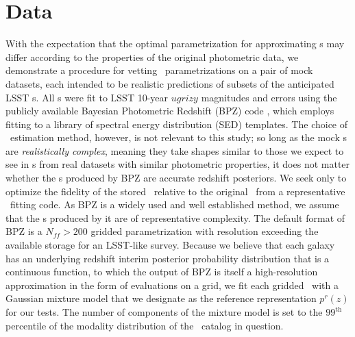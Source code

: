 \section{Data}

With the expectation that the optimal parametrization for approximating \pz s 
may differ according to the properties of the original photometric data, we 
demonstrate a procedure for vetting \pz\ parametrizations on a pair of mock 
datasets, each intended to be realistic predictions of subsets of the 
anticipated LSST \pz s.
All \pz s were fit to LSST 10-year $ugrizy$ magnitudes and errors 
\citep{ivezic_lsst:_2008} using the publicly available Bayesian Photometric 
Redshift (BPZ) code \citep{benitez_bayesian_2000}, which employs fitting to a 
library of spectral energy distribution (SED) templates.
The choice of \pz\ estimation method, however, is not relevant to this study; 
so long as the mock \pz s are \textit{realistically complex}, meaning they take 
shapes similar to those we expect to see in \pz s from real datasets with 
similar photometric properties, it does not matter whether the \pz s produced 
by BPZ are accurate redshift posteriors.
We seek only to optimize the fidelity of the stored \pz\ relative to the 
original \pz\ from a representative \pz\ fitting code.
\citep[See][Schmidt, et al.\ in preparation for other work comparing the 
accuracy of \pz s produced by different methods.]{tanaka_photometric_2017, 
	de_jong_third_2017, amaro_metaphor:_2016}
As BPZ is a widely used and well established method, we assume that the \pz s 
produced by it are of representative complexity.
The default format of BPZ is a $N_{ff}>200$ gridded parametrization with 
resolution exceeding the available storage for an LSST-like survey.
Because we believe that each galaxy has an underlying redshift interim 
posterior probability distribution that is a continuous function, to which the 
output of BPZ is itself a high-resolution approximation in the form of 
evaluations on a grid, we fit each gridded \pz\ with a Gaussian mixture model 
that we designate as the reference representation $p^{r}(z)$ for our tests.
The number of components of the mixture model is set to the $99^{\mathrm{th}}$ 
percentile of the modality distribution of the \pz\ catalog in question.

